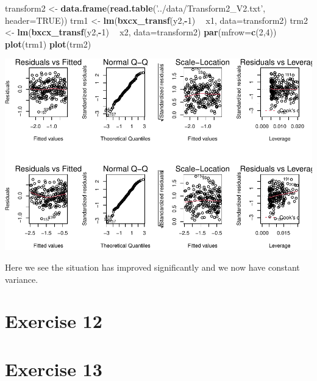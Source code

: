 \documentclass[]{article}
\newenvironment{Shaded}{\begin{snugshade}}{\end{snugshade}}
\newcommand{\DataTypeTok}[1]{\textcolor[rgb]{0.13,0.29,0.53}{#1}}
\newcommand{\DecValTok}[1]{\textcolor[rgb]{0.00,0.00,0.81}{#1}}
\newcommand{\KeywordTok}[1]{\textcolor[rgb]{0.13,0.29,0.53}{\textbf{#1}}}
\newcommand{\NormalTok}[1]{#1}
\newcommand{\OperatorTok}[1]{\textcolor[rgb]{0.81,0.36,0.00}{\textbf{#1}}}
\newcommand{\OtherTok}[1]{\textcolor[rgb]{0.56,0.35,0.01}{#1}}
\newcommand{\StringTok}[1]{\textcolor[rgb]{0.31,0.60,0.02}{#1}}
\begin{document}
\begin{Shaded}
\begin{Highlighting}[]
\NormalTok{transform2 <-}\StringTok{ }\KeywordTok{data.frame}\NormalTok{(}\KeywordTok{read.table}\NormalTok{(}\StringTok{'../data/Transform2_V2.txt'}\NormalTok{, }\DataTypeTok{header=}\OtherTok{TRUE}\NormalTok{))}
\NormalTok{trm1 <-}\StringTok{ }\KeywordTok{lm}\NormalTok{(}\KeywordTok{bxcx_transf}\NormalTok{(y2,}\OperatorTok{-}\DecValTok{1}\NormalTok{) }\OperatorTok{~}\StringTok{ }\NormalTok{x1, }\DataTypeTok{data=}\NormalTok{transform2)}
\NormalTok{trm2 <-}\StringTok{ }\KeywordTok{lm}\NormalTok{(}\KeywordTok{bxcx_transf}\NormalTok{(y2,}\OperatorTok{-}\DecValTok{1}\NormalTok{) }\OperatorTok{~}\StringTok{ }\NormalTok{x2, }\DataTypeTok{data=}\NormalTok{transform2)}
\KeywordTok{par}\NormalTok{(}\DataTypeTok{mfrow=}\KeywordTok{c}\NormalTok{(}\DecValTok{2}\NormalTok{,}\DecValTok{4}\NormalTok{))}
\KeywordTok{plot}\NormalTok{(trm1)}
\KeywordTok{plot}\NormalTok{(trm2)}
\end{Highlighting}
\end{Shaded}

\includegraphics{./figures/unnamed-chunk-35-1.pdf}

Here we see the situation has improved significantly and we now have
constant variance.

\newpage

\hypertarget{exercise-12}{%
\section{Exercise 12}\label{exercise-12}}

\newpage

\hypertarget{exercise-13}{%
\section{Exercise 13}\label{exercise-13}}
\end{document}

